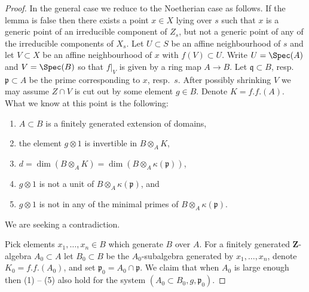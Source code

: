 \begin{proof}
\medskip\noindent
In the general case we reduce to the Noetherian case as follows.
If the lemma is false then there exists a point
$x \in X$ lying over $s$ such that $x$ is a generic point of an
irreducible component of $Z_s$, but
not a generic point of any of the irreducible components of $X_s$.
Let $U \subset S$ be an affine neighbourhood of $s$ and let
$V \subset X$ be an affine neighbourhood of $x$ with $f(V) \subset U$.
Write $U = \Spec(A)$ and $V = \Spec(B)$ so that $f|_V$
is given by a ring map $A \to B$. Let $\mathfrak q \subset B$,
resp.\ $\mathfrak p \subset A$ be the prime corresponding to $x$, resp.\ $s$.
After possibly shrinking $V$ we may assume $Z \cap V$ is cut out by
some element $g \in B$. Denote $K = f.f.(A)$. What we know at this point
is the following:
\begin{enumerate}
\item $A \subset B$ is a finitely generated extension of domains,
\item the element $g \otimes 1$ is invertible in $B \otimes_A K$,
\item $d = \dim(B \otimes_A K) = \dim(B \otimes_A \kappa(\mathfrak p))$,
\item $g \otimes 1$ is not a unit of $B \otimes_A \kappa(\mathfrak p)$, and
\item $g \otimes 1$ is not in any of the minimal primes of
$B \otimes_A \kappa(\mathfrak p)$.
\end{enumerate}
We are seeking a contradiction.

\medskip\noindent
Pick elements $x_1, \ldots, x_n \in B$ which generate $B$ over $A$.
For a finitely generated $\mathbf{Z}$-algebra $A_0 \subset A$
let $B_0 \subset B$ be the $A_0$-subalgebra generated by
$x_1, \ldots, x_n$, denote $K_0 = f.f.(A_0)$, and set
$\mathfrak p_0 = A_0 \cap \mathfrak p$.
We claim that when $A_0$ is large enough then (1) -- (5) also hold for
the system $(A_0 \subset B_0, g, \mathfrak p_0)$.


\end{proof}
